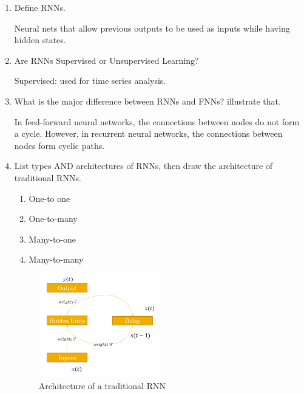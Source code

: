 \documentclass[12pt]{article}
\newenvironment{QandA}{\begin{enumerate}[label=\bfseries\arabic*.]\bfseries}
{\end{enumerate}}
\newenvironment{answered}{\par\normalfont\color{Sepia}}{}
\begin{document}
\begin{QandA}
    \item Define RNNs.
    \begin{answered}
        Neural nets that allow previous outputs to be used as inputs while having hidden states.
    \end{answered}

    \item Are RNNs Supervised or Unsupervised Learning?
    \begin{answered}
        Supervised: used for time series analysis.
    \end{answered}

    \item What is the major difference between RNNs and FNNs? illustrate that.
    \begin{answered}
        In feed-forward neural networks, the connections between nodes do not form a cycle.  However,
        in recurrent neural networks, the connections between nodes form cyclic paths.
    \end{answered}

    \item List types AND architectures of RNNs, then draw the architecture of traditional RNNs.
    \begin{answered}
        \begin{enumerate}
            \item One-to one
            \item One-to-many
            \item Many-to-one
            \item Many-to-many
        \end{enumerate}
        \begin{figure}[H]
            \centering
            \includegraphics[width=0.5\textwidth]{rnn.png}
            \caption{Architecture of a traditional RNN}
            \label{fig:rnn}
        \end{figure}


\end{answered}
\end{QandA}
\end{document}
